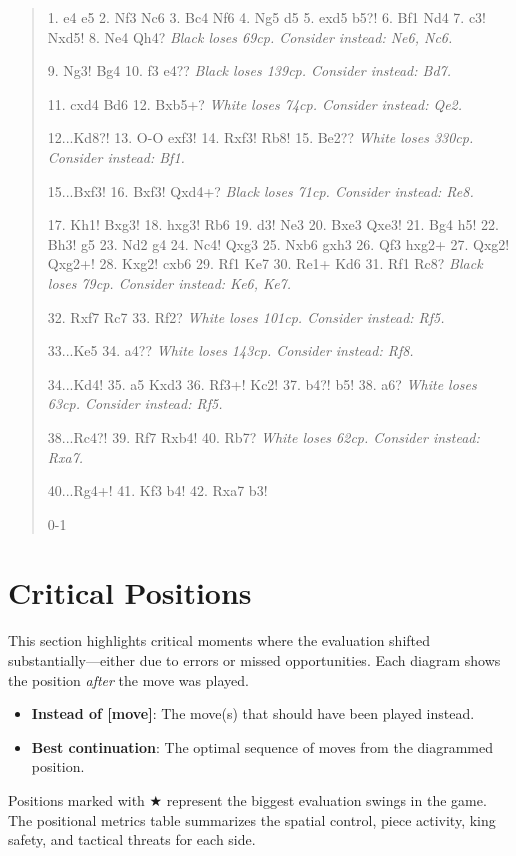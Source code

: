 \documentclass[11pt]{book}
\begin{document}
\begin{quote}
1. e4 e5
2. Nf3 Nc6
3. Bc4 Nf6
4. Ng5 d5
5. exd5 b5?!
6. Bf1 Nd4
7. c3! Nxd5!
8. Ne4 Qh4?
\textit{Black loses 69cp. Consider instead: Ne6, Nc6.}

9. Ng3! Bg4
10. f3 e4??
\textit{Black loses 139cp. Consider instead: Bd7.}

11. cxd4 Bd6
12. Bxb5+?
\textit{White loses 74cp. Consider instead: Qe2.}

12...Kd8?!
13. O-O exf3!
14. Rxf3! Rb8!
15. Be2??
\textit{White loses 330cp. Consider instead: Bf1.}

15...Bxf3!
16. Bxf3! Qxd4+?
\textit{Black loses 71cp. Consider instead: Re8.}

17. Kh1! Bxg3!
18. hxg3! Rb6
19. d3! Ne3
20. Bxe3 Qxe3!
21. Bg4 h5!
22. Bh3! g5
23. Nd2 g4
24. Nc4! Qxg3
25. Nxb6 gxh3
26. Qf3 hxg2+
27. Qxg2! Qxg2+!
28. Kxg2! cxb6
29. Rf1 Ke7
30. Re1+ Kd6
31. Rf1 Rc8?
\textit{Black loses 79cp. Consider instead: Ke6, Ke7.}

32. Rxf7 Rc7
33. Rf2?
\textit{White loses 101cp. Consider instead: Rf5.}

33...Ke5
34. a4??
\textit{White loses 143cp. Consider instead: Rf8.}

34...Kd4!
35. a5 Kxd3
36. Rf3+! Kc2!
37. b4?! b5!
38. a6?
\textit{White loses 63cp. Consider instead: Rf5.}

38...Rc4?!
39. Rf7 Rxb4!
40. Rb7?
\textit{White loses 62cp. Consider instead: Rxa7.}

40...Rg4+!
41. Kf3 b4!
42. Rxa7 b3!

0-1
\end{quote}

\section{Critical Positions}

This section highlights critical moments where the evaluation shifted substantially---either due to errors or missed opportunities. Each diagram shows the position \emph{after} the move was played.

\begin{itemize}
\item \textbf{Instead of [move]}: The move(s) that should have been played instead.
\item \textbf{Best continuation}: The optimal sequence of moves from the diagrammed position.
\end{itemize}

Positions marked with {\color{blue}$\bigstar$} represent the biggest evaluation swings in the game. The positional metrics table summarizes the spatial control, piece activity, king safety, and tactical threats for each side.
\end{document}
